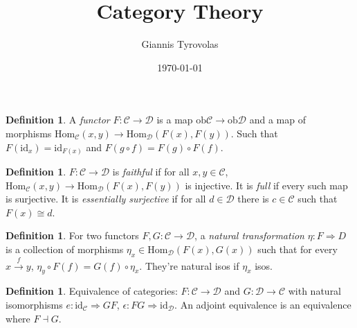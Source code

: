 \documentclass[a4paper,10pt]{article}
\title{Category Theory}
\author{Giannis Tyrovolas}
\date{\today}
\theoremstyle{definition}
\newtheorem{definition}[theorem]{Definition}
\newcommand{\Hom}[3][C]{\mathrm{Hom}_\mathcal{#1}(#2, #3)}
\newcommand{\C}{\mathcal{C}}
\newcommand{\D}{\mathcal{D}}
\newcommand{\id}{\mathrm{id}}
\begin{document}
\begin{definition}
    A \emph{functor} $F \colon \C \longrightarrow \D$ is a map $\mathrm{ob} \C \rightarrow \mathrm{ob} \D$ and a map of morphisms $\Hom[C]{x}{y} \rightarrow \Hom[D]{F(x)}{F(y)}$. Such that $F(\id_x) = \id_{F(x)}$ and $F(g \circ f) = F(g) \circ F(f)$.
\end{definition}

\begin{definition}
    $F \colon \C \rightarrow \D$ is \emph{faithful} if for all $x, y \in \C$, $\Hom{x}{y} \rightarrow \Hom[D]{F(x)}{F(y)}$ is injective.
    It is \emph{full} if every such map is surjective.
    It is \emph{essentially surjective} if for all $d \in \D$ there is $c \in \C$ such that $F(x) \cong d$.
\end{definition}

\begin{definition}
    For two functors $F, G \colon \C \rightarrow \D$, a \emph{natural transformation} $\eta \colon F \Rightarrow D$ is a collection of morphisms $\eta_x \in \Hom[D]{F(x)}{G(x)}$ such that for every $x \xrightarrow{f} y$, $\eta_y \circ F(f) = G(f) \circ \eta_x$. They're natural isos if $\eta_x$ isos.
\end{definition}
\begin{definition}
    Equivalence of categories: $F \colon \C \rightarrow \D$ and $G \colon \D \rightarrow \C$ with natural isomorphisms $e \colon \id_{\C} \Rightarrow GF$, $\epsilon \colon FG \Rightarrow \id_{\D}$. An adjoint equivalence is an equivalence where $F \dashv G$.
\end{definition}
\end{document}
